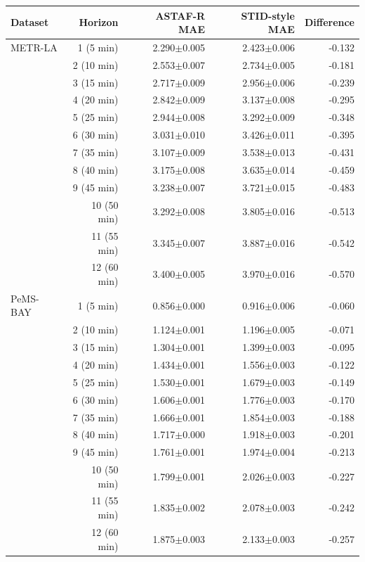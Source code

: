 \begin{tabular}{lrrrr}
\toprule
Dataset & Horizon & ASTAF-R MAE & STID-style MAE & Difference\\
\midrule
METR-LA & 1 (5 min) & 2.290$\pm$0.005 & 2.423$\pm$0.006 & -0.132\\
 & 2 (10 min) & 2.553$\pm$0.007 & 2.734$\pm$0.005 & -0.181\\
 & 3 (15 min) & 2.717$\pm$0.009 & 2.956$\pm$0.006 & -0.239\\
 & 4 (20 min) & 2.842$\pm$0.009 & 3.137$\pm$0.008 & -0.295\\
 & 5 (25 min) & 2.944$\pm$0.008 & 3.292$\pm$0.009 & -0.348\\
 & 6 (30 min) & 3.031$\pm$0.010 & 3.426$\pm$0.011 & -0.395\\
 & 7 (35 min) & 3.107$\pm$0.009 & 3.538$\pm$0.013 & -0.431\\
 & 8 (40 min) & 3.175$\pm$0.008 & 3.635$\pm$0.014 & -0.459\\
 & 9 (45 min) & 3.238$\pm$0.007 & 3.721$\pm$0.015 & -0.483\\
 & 10 (50 min) & 3.292$\pm$0.008 & 3.805$\pm$0.016 & -0.513\\
 & 11 (55 min) & 3.345$\pm$0.007 & 3.887$\pm$0.016 & -0.542\\
 & 12 (60 min) & 3.400$\pm$0.005 & 3.970$\pm$0.016 & -0.570\\
\midrule
PeMS-BAY & 1 (5 min) & 0.856$\pm$0.000 & 0.916$\pm$0.006 & -0.060\\
 & 2 (10 min) & 1.124$\pm$0.001 & 1.196$\pm$0.005 & -0.071\\
 & 3 (15 min) & 1.304$\pm$0.001 & 1.399$\pm$0.003 & -0.095\\
 & 4 (20 min) & 1.434$\pm$0.001 & 1.556$\pm$0.003 & -0.122\\
 & 5 (25 min) & 1.530$\pm$0.001 & 1.679$\pm$0.003 & -0.149\\
 & 6 (30 min) & 1.606$\pm$0.001 & 1.776$\pm$0.003 & -0.170\\
 & 7 (35 min) & 1.666$\pm$0.001 & 1.854$\pm$0.003 & -0.188\\
 & 8 (40 min) & 1.717$\pm$0.000 & 1.918$\pm$0.003 & -0.201\\
 & 9 (45 min) & 1.761$\pm$0.001 & 1.974$\pm$0.004 & -0.213\\
 & 10 (50 min) & 1.799$\pm$0.001 & 2.026$\pm$0.003 & -0.227\\
 & 11 (55 min) & 1.835$\pm$0.002 & 2.078$\pm$0.003 & -0.242\\
 & 12 (60 min) & 1.875$\pm$0.003 & 2.133$\pm$0.003 & -0.257\\
\bottomrule
\end{tabular}

